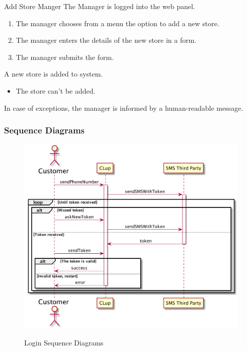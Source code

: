 \usecase
{Add Store}
{Manger}
{The Manager is logged into the web panel.}
{
    \begin{enumerate}
        \item The manager chooses from a menu the option to add a new store.
        \item The manager enters the details of the new store in a form.
        \item The manager submits the form.
    \end{enumerate}
}
{
    A new store is added to system.
}
{
    \begin{itemize}
        \item The store can't be added.
    \end{itemize}
}
{
    In case of exceptions, the manager is informed by a human-readable message.
}



\subsubsection{Sequence Diagrams}


\begin{figure}[H]
    \centering
    \includegraphics[width=1\textwidth]{uml/login.png}
    \label{fig:seqdiag-login}
    \caption{Login Sequence Diagrams}
\end{figure}



